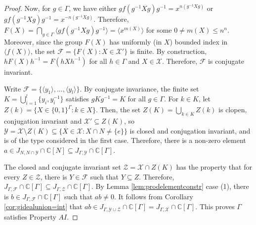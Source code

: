 \documentclass[a4paper, 12pt]{amsart}
\theoremstyle{definition}
\theoremstyle{remark}
\numberwithin{equation}{section}
\begin{document}
\begin{proof}
    Now, for $g\in \Gamma$, we have either  $gf(g^{-1}Xg)g^{-1} = x^{n(g^{-1}Xg)}$ or $gf(g^{-1}Xg)g^{-1} = x^{ - n(g^{-1}Xg)}$. Therefore, $F(X) = \bigcap_{g\in \Gamma}\langle gf(g^{-1}Xg)g^{-1}\rangle = \langle x^{m(X)}\rangle $ for some $0 \neq m(X)\leq n^{n} $. Moreover, since the group $F(X)$ has uniformly (in $X$) bounded index in $\langle f(X)\rangle $, the set $\mathcal{F} = \{F(X):X\in \mathcal{X}'\}$ is finite. By construction, $hF(X)h^{-1} = F(hXh^{-1})$ for all $h\in \Gamma$ and $X\in\mathcal{X}$. Therefore, $\mathcal{F}$ is conjugate invariant.

    Write $\mathcal{F} = \{\langle y_{1}\rangle,..., \langle y_{l}\rangle \}$. By conjugate invariance, the finite set $K = \bigcup^{l}_{i=1}\{y_{i},y_{i}^{-1}\}$ satisfies  $gKg^{-1} = K$ for all $g\in \Gamma$. For $k\in K$, let $Z(k) = \{X\in \{0,1\}^{\Gamma}: k\in X\}$. Then, the set $Z(K) = \bigcup_{k\in K} Z(k)$ is clopen, conjugation invariant and $\mathcal{X}'\subseteq Z(K)$, so $\mathcal{Y} = \mathcal{X}\setminus Z(K) \subseteq\{X\in\mathcal{X}: X\cap N\neq \{e\}\}$ is closed and conjugation invariant, and is of the type considered in the first case. Therefore, there is a non-zero element $a\in J_{N, N\cap\mathcal{Y}}\cap\mathbb{C}[N]\subseteq J_{\Gamma, \mathcal{Y}}\cap\mathbb{C}[\Gamma]$.

    The closed and conjugate invariant set $\mathcal{Z} = \mathcal{X}\cap Z(K)$ has the property that for every $Z\in\mathcal{Z}$, there is $Y\in\mathcal{F}$ such that $Y\subseteq Z$. Therefore, $J_{\Gamma, \mathcal{F}}\cap\mathbb{C}[\Gamma]\subseteq J_{\Gamma, \mathcal{Z}}\cap\mathbb{C}[\Gamma]$. By Lemma \ref{lem:prodelementconstr} case (1), there is $b\in J_{\Gamma, \mathcal{F}}\cap\mathbb{C}[\Gamma]$ such that $ab\neq 0$. It follows from Corollary \ref{cor:gidealunion=int} that $ab\in J_{\Gamma, \mathcal{Y}\cup\mathcal{Z}}\cap\mathbb{C}[\Gamma]=J_{\Gamma, \mathcal{X}}\cap\mathbb{C}[\Gamma]$. This proves $\Gamma$ satisfies Property $AI$.
\end{proof}
\end{document}
